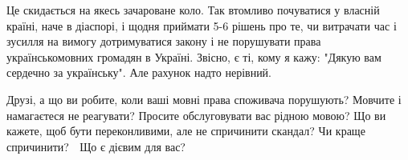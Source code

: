 Це скидається на якесь зачароване коло. Так втомливо почуватися у власній
країні, наче в діаспорі, і щодня приймати 5-6 рішень про те, чи витрачати час і
зусилля на вимогу дотримуватися закону і не порушувати права українськомовних
громадян в Україні. Звісно, є ті, кому я кажу: "Дякую вам сердечно за
українську". Але рахунок надто нерівний.

Друзі, а що ви робите, коли ваші мовні права споживача порушують? Мовчите і
намагаєтеся не реагувати? Просите обслуговувати вас рідною мовою? Що ви кажете,
щоб бути переконливими, але не спричинити скандал? Чи краще спричинити? 🙂 Що є
дієвим для вас?


